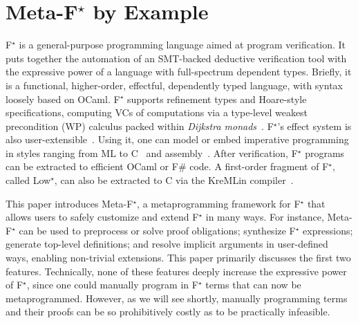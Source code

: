 \documentclass[runningheads]{llncs}
\newcommand\fstar{F$^\star$\xspace}
\newcommand\metafstar{Meta-F$^\star$\xspace}
\newcommand\lowstar{Low$^\star$\xspace}
\newcommand{\comm}[3]{\ifcheckpagebudget\else\ifdraft{{\color{#1}[#2: #3]}}\fi\fi}
\newcommand{\nik}[1]{\comm{dkpurple}{Nik}{#1}}
\newcommand{\aseem}[1]{\comm{magenta}{Aseem}{#1}}
\newcommand{\guido}[1]{\comm{blue}{Guido}{#1}}
\begin{document}
\section{\metafstar by Example}
\label{sec:by-example}

\fstar is a general-purpose
programming language aimed at program verification.
%
It puts together the automation of an SMT-backed deductive
verification tool with the expressive power of a language
with full-spectrum dependent types.
%
Briefly, it is a functional, higher-order, effectful, dependently typed
language, with syntax loosely based on OCaml.
%
\fstar supports refinement types and Hoare-style specifications,
computing VCs of computations via a type-level weakest
precondition (WP) calculus packed within \emph{Dijkstra
monads}~\cite{fstar-pldi13}.
%
\fstar's effect system is also user-extensible~\cite{dm4free}.
%
Using it, one can model or embed %
imperative programming in
styles ranging from ML to
C~\cite{lowstar} and
assembly~\cite{valefstar}.
%
After verification, \fstar programs can be extracted to efficient
OCaml or F\# code. A first-order fragment of \fstar, 
called \lowstar, can also be extracted to C via the KreMLin compiler~\cite{lowstar}.

This paper introduces \metafstar, a metaprogramming framework for
\fstar that allows users to safely customize and extend \fstar in many
ways.
%
For instance, \metafstar can be used to preprocess or solve proof
obligations; synthesize \fstar expressions; generate
top-level definitions; and resolve implicit arguments in user-defined
ways, enabling non-trivial extensions.
%
This paper primarily discusses the first two features.
%
Technically, none of these features deeply increase the expressive power
of \fstar, since one could manually program in \fstar terms that can
now be metaprogrammed. However, as we will see shortly, manually
programming terms and their proofs can be so prohibitively costly as
to be practically infeasible.
\end{document}
